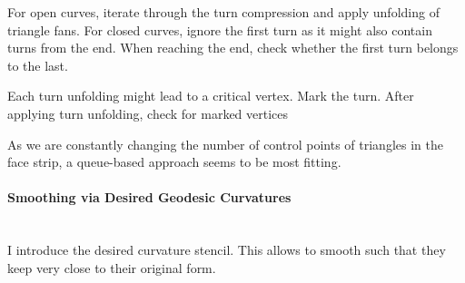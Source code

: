 \documentclass{stdlocal}
\begin{document}
  For open curves, iterate through the turn compression and apply unfolding of triangle fans.
  For closed curves, ignore the first turn as it might also contain turns from the end.
  When reaching the end, check whether the first turn belongs to the last.

  Each turn unfolding might lead to a critical vertex.
  Mark the turn.
  After applying turn unfolding, check for marked vertices

  As we are constantly changing the number of control points of triangles in the face strip, a queue-based approach seems to be most fitting.

  \paragraph{Smoothing via Desired Geodesic Curvatures}\hfill\\
  I introduce the desired curvature stencil.
  This allows to smooth such that they keep very close to their original form.





\end{document}
